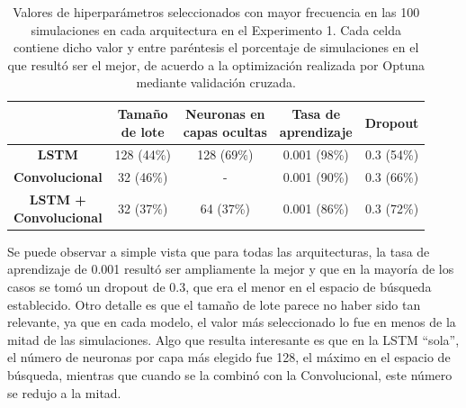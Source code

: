 \documentclass[../../main.tex]{subfiles}
\begin{document}
\begin{table}[H]
    \centering
    \renewcommand{\arraystretch}{1.2}
    \begin{tabular}{|c|c|c|c|c|}
        \hline
            & \makecell{\textbf{Tamaño}\\\textbf{de lote}}
            & \makecell{\textbf{Neuronas en}\\\textbf{capas ocultas}}
            & \makecell{\textbf{Tasa de}\\\textbf{aprendizaje}}
            & \textbf{Dropout} \\ \hline\hline
        \textbf{LSTM}
            & 128 (44\%) & 128 (69\%) & 0.001 (98\%) & 0.3 (54\%) \\ \hline
        \textbf{Convolucional}
            & 32 (46\%)  & -          & 0.001 (90\%) & 0.3 (66\%) \\ \hline
        \makecell{\textbf{LSTM +}\\\textbf{Convolucional}}
            & 32 (37\%)  & 64 (37\%)  & 0.001 (86\%) & 0.3 (72\%) \\
        \hline
    \end{tabular}
    \caption{Valores de hiperparámetros seleccionados con mayor frecuencia en las 100
    simulaciones en cada arquitectura en el Experimento 1. Cada celda contiene dicho valor
    y entre paréntesis el porcentaje de simulaciones en el que resultó ser el mejor, de
    acuerdo a la optimización realizada por Optuna mediante validación cruzada.}
    \label{tab:hyperparams_exp1}
\end{table}

Se puede observar a simple vista que para todas las arquitecturas, la tasa de aprendizaje
de 0.001 resultó ser ampliamente la mejor y que en la mayoría de los casos se tomó un
dropout de 0.3, que era el menor en el espacio de búsqueda establecido. Otro detalle es
que el tamaño de lote parece no haber sido tan relevante, ya que en cada modelo, el valor
más seleccionado lo fue en menos de la mitad de las simulaciones. Algo que resulta
interesante es que en la LSTM ``sola'', el número de neuronas por capa más elegido fue
128, el máximo en el espacio de búsqueda, mientras que cuando se la combinó con la
Convolucional, este número se redujo a la mitad.
\end{document}
